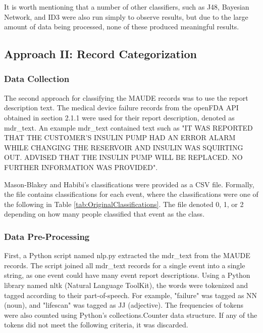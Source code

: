 \documentclass[11pt, notitlepage,abstracton,oneside]{article}   	%
\begin{document}
It is worth mentioning that a number of other classifiers, such as J48, Bayesian Network, and ID3 were also run simply to observe results, but due to the large amount of data being processed, none of these produced meaningful results. 

\subsection{Approach II: Record Categorization}
\subsubsection{Data Collection}
The second approach for classifying the MAUDE records was to use the report description text. The medical device failure records from the openFDA API obtained in section 2.1.1 were used for their report description, denoted as mdr\_text. An example mdr\_text contained text such as "IT WAS REPORTED THAT THE CUSTOMER'S INSULIN PUMP HAD AN ERROR ALARM WHILE CHANGING THE RESERVOIR AND INSULIN WAS SQUIRTING OUT. ADVISED THAT THE INSULIN PUMP WILL BE REPLACED. NO FURTHER INFORMATION WAS PROVIDED". 

Mason-Blakey and Habibi's classifications were provided as a CSV file. Formally, the file contains classifications for each event, where the classifications were one of the following in Table \ref{tab:OriginalClassifications}. The file denoted 0, 1, or 2 depending on how many people classified that event as the class.

\subsubsection{Data Pre-Processing}
First, a Python script named nlp.py extracted the mdr\_text from the MAUDE records. The script joined all mdr\_text records for a single event into a single string, as one event could have many event report descriptions. Using a Python library named nltk (Natural Language ToolKit), the words were tokenized and tagged according to their part-of-speech. For example, "failure" was tagged as NN (noun), and "lifescan" was tagged as JJ (adjective). The frequencies of tokens were also counted using Python's collections.Counter data structure. If any of the tokens did not meet the following criteria, it was discarded.
\end{document}
